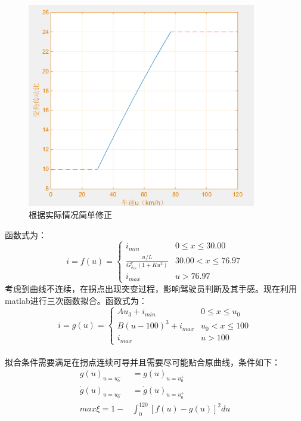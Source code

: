\documentclass[a4paper,12pt,UTF8]{ctexart}
\begin{document}
\begin{figure}[htbp]
  \centering
  \includegraphics[width=10cm]{7.png}
  \caption{根据实际情况简单修正}
\end{figure}\newpage
\indent 函数式为：\\
\[i=f(u)=\begin{cases}
         i_{min} &  0 \leq x\leq30.00\\
         \frac{u/L}{G^r_{\delta_{sw}}(1+Ku^2)} &  30.00< x\leq76.97 \\
         i_{max} & u>76.97
       \end{cases}\]
\indent 考虑到曲线不连续，在拐点出现突变过程，影响驾驶员判断及其手感。现在利用matlab进行三次函数拟合。函数式为：\\
\[i=g(u)=\begin{cases}
         Au_3+i_{min} &  0 \leq x\leq u_0\\
         B(u-100)^3+i_{max} & u_0<x\leq 100 \\
         i_{max} & u> 100
       \end{cases}\]\\
\indent 拟合条件需要满足在拐点连续可导并且需要尽可能贴合原曲线，条件如下：\\
\begin{align*}
  g(u)_{u=u_0^-} & =g(u)_{u=u_0^+} \\
  \dot{g}(u)_{u=u_0^-}&=\dot{g}(u)_{u=u_0^+} \\
  max \xi=1-&\int_{0}^{120}[f(u)-g(u)]^2du
\end{align*}\\
\end{document}
